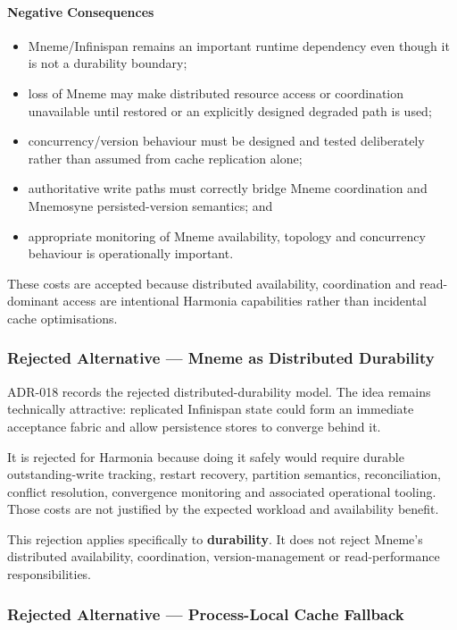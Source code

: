 \paragraph{Negative Consequences}

\begin{itemize}
    \item Mneme/Infinispan remains an important runtime dependency even though it is not a durability boundary;
    \item loss of Mneme may make distributed resource access or coordination unavailable until restored or an explicitly designed degraded path is used;
    \item concurrency/version behaviour must be designed and tested deliberately rather than assumed from cache replication alone;
    \item authoritative write paths must correctly bridge Mneme coordination and Mnemosyne persisted-version semantics; and
    \item appropriate monitoring of Mneme availability, topology and concurrency behaviour is operationally important.
\end{itemize}

These costs are accepted because distributed availability, coordination and read-dominant access are intentional Harmonia capabilities rather than incidental cache optimisations.

\subsubsection{Rejected Alternative --- Mneme as Distributed Durability}

ADR-018 records the rejected distributed-durability model. The idea remains technically attractive: replicated Infinispan state could form an immediate acceptance fabric and allow persistence stores to converge behind it.

It is rejected for Harmonia because doing it safely would require durable outstanding-write tracking, restart recovery, partition semantics, reconciliation, conflict resolution, convergence monitoring and associated operational tooling. Those costs are not justified by the expected workload and availability benefit.

This rejection applies specifically to \textbf{durability}. It does not reject Mneme's distributed availability, coordination, version-management or read-performance responsibilities.

\subsubsection{Rejected Alternative --- Process-Local Cache Fallback}

